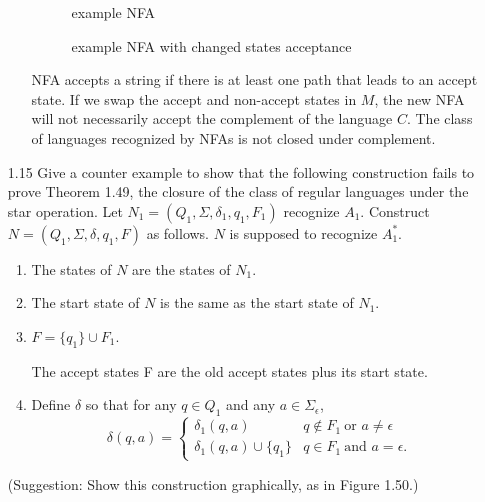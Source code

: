 \begin{enumerate}
\begin{enumerate}
                    \begin{figure}[H]
                        \centering
                        \caption{example NFA}
                        \caption{example NFA with changed states acceptance}
                    \end{figure}

                    NFA accepts a string if there is at least one path that leads to an accept state. If we swap the accept and non-accept states in $M$, the new NFA will not necessarily accept the complement of the language $C$. The class of languages recognized by NFAs is not closed under complement.
          \end{enumerate}
    \item [1.15]
          Give a counter example to show that the following construction fails to prove Theorem 1.49, the closure of the class of regular languages under the star operation. Let $N_1 = (Q_1,\Sigma,\delta_1,q_1,F_1)$ recognize $A_1$. Construct $N = (Q_1,\Sigma,\delta,q_1,F)$ as follows. $N$ is supposed to recognize $A_1^\ast$.
          \begin{enumerate}
              \item The states of $N$ are the states of $N_1$.
              \item The start state of $N$ is the same as the start state of $N_1$.
              \item $F =\{q_1\} \cup F_1$.

                    The accept states F are the old accept states plus its start state.
              \item Define $\delta$ so that for any $q \in Q_1$ and any $a \in \Sigma_\epsilon$,
                    $$\delta(q,a)=
                        \begin{cases}
                            \delta_1(q,a)              & q \notin F_1~ \text{or }a \neq \epsilon \\
                            \delta_1(q,a) \cup \{q_1\} & q \in F_1~ \text{and }a = \epsilon.
                        \end{cases}
                    $$
          \end{enumerate}
          (Suggestion: Show this construction graphically, as in Figure 1.50.)


\end{enumerate}
